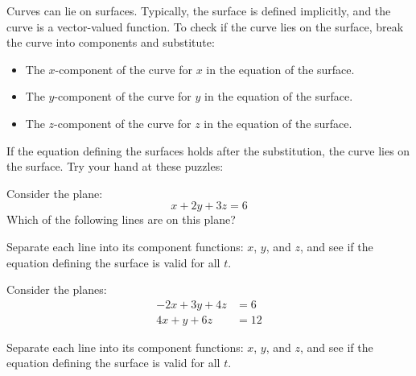 \documentclass{ximera}
\begin{document}
Curves can lie on surfaces. Typically, the surface is defined
implicitly, and the curve is a vector-valued function. To check if the
curve lies on the surface, break the curve into components and
substitute:
\begin{itemize}
  \item The $x$-component of the curve for $x$ in the equation of the
    surface.
  \item The $y$-component of the curve for $y$ in the equation of
    the surface.
  \item The $z$-component of the curve for $z$ in the equation of the
    surface.
\end{itemize}
If the equation defining the surfaces holds after the substitution, the
curve lies on the surface. Try your hand at these puzzles:

\begin{question}
  Consider the plane:
  \[
  x+2y+3z = 6
  \]
  Which of the following lines are on this plane?
  \begin{hint}
    Separate each line into its component functions: $x$, $y$, and
    $z$, and see if the equation defining the surface is valid for all
    $t$.
  \end{hint}
  \begin{selectAll}
  \end{selectAll}
\end{question}

\begin{question}
  Consider the planes:
  \begin{align*}
    -2x+3y+4z &=6\\
    4x+y+6z &=12
  \end{align*}
  \begin{hint}
    Separate each line into its component functions: $x$, $y$, and
    $z$, and see if the equation defining the surface is valid for all
    $t$.
  \end{hint}
 \begin{selectAll}
  \end{selectAll}
\end{question}
\end{document}
